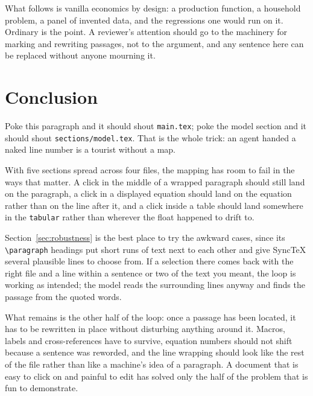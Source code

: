 \documentclass[11pt]{article}
\begin{document}
What follows is vanilla economics by design: a production function, a
household problem, a panel of invented data, and the regressions one would run
on it. Ordinary is the point. A reviewer's attention should go to the machinery
for marking and rewriting passages, not to the argument, and any sentence here
can be replaced without anyone mourning it.









\section{Conclusion}

Poke this paragraph and it should shout \texttt{main.tex}; poke the model section
and it should shout \texttt{sections/model.tex}. That is the whole trick: an
agent handed a naked line number is a tourist without a map.

With five sections spread across four files, the mapping has room to fail in the
ways that matter. A click in the middle of a wrapped paragraph should still land
on the paragraph, a click in a displayed equation should land on the equation
rather than on the line after it, and a click inside a table should land
somewhere in the \texttt{tabular} rather than wherever the float happened to
drift to.

Section~\ref{sec:robustness} is the best place to try the awkward cases, since
its \verb|\paragraph| headings put short runs of text next to each other and
give SyncTeX several plausible lines to choose from. If a selection there comes
back with the right file and a line within a sentence or two of the text you
meant, the loop is working as intended; the model reads the surrounding lines
anyway and finds the passage from the quoted words.

What remains is the other half of the loop: once a passage has been located, it
has to be rewritten in place without disturbing anything around it. Macros,
labels and cross-references have to survive, equation numbers should not shift
because a sentence was reworded, and the line wrapping should look like the rest
of the file rather than like a machine's idea of a paragraph. A document that is
easy to click on and painful to edit has solved only the half of the problem
that is fun to demonstrate.
\end{document}

